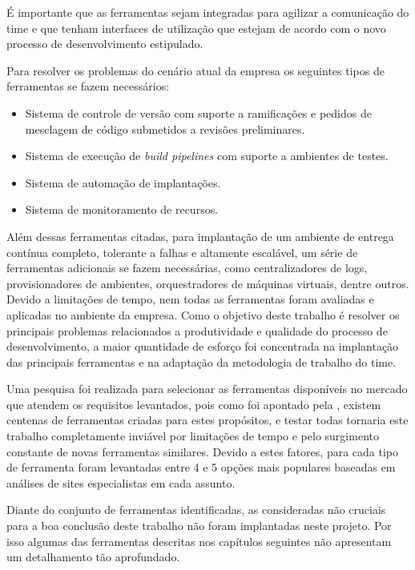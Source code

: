 \documentclass[
	12pt,				%
	openright,			%
	twoside,			%
	a4paper,			%
	english,			%
	french,				%
	spanish,			%
	brazil,				%
	]{abntex2}
\begin{document}
É importante que as ferramentas sejam integradas para agilizar a comunicação do time e que tenham interfaces de utilização que estejam de acordo com o novo processo de desenvolvimento estipulado.

Para resolver os problemas do cenário atual da empresa os seguintes tipos de ferramentas se fazem necessários:

\begin{itemize}
	\item Sistema de controle de versão com suporte a ramificações e pedidos de mesclagem de código submetidos a revisões preliminares.
	\item Sistema de execução de \textit{build pipelines} com suporte a ambientes de testes.
	\item Sistema de automação de implantações.
	\item Sistema de monitoramento de recursos.
\end{itemize}

Além dessas ferramentas citadas, para implantação de um ambiente de entrega contínua completo, tolerante a falhas e altamente escalável, um série de ferramentas adicionais se fazem necessárias, como centralizadores de logs, provisionadores de ambientes, orquestradores de máquinas virtuais, dentre outros. Devido a limitações de tempo, nem todas as ferramentas foram avaliadas e aplicadas no ambiente da empresa. Como o objetivo deste trabalho é resolver os principais problemas relacionados a produtividade e qualidade do processo de desenvolvimento, a maior quantidade de esforço foi concentrada na implantação das principais ferramentas e na adaptação da metodologia de trabalho do time.

Uma pesquisa foi realizada para selecionar as ferramentas disponíveis no mercado que atendem os requisitos levantados, pois como foi apontado pela , existem centenas de ferramentas criadas para estes propósitos, e testar todas tornaria este trabalho completamente inviável por limitações de tempo e pelo surgimento constante de novas ferramentas similares. Devido a estes fatores, para cada tipo de ferramenta foram levantadas entre 4 e 5 opções mais populares baseadas em análises de sites especialistas em cada assunto.

Diante do conjunto de ferramentas identificadas, as consideradas não cruciais para a boa conclusão deste trabalho não foram implantadas neste projeto. Por isso algumas das ferramentas descritas nos capítulos seguintes não apresentam um detalhamento tão aprofundado.
\end{document}
